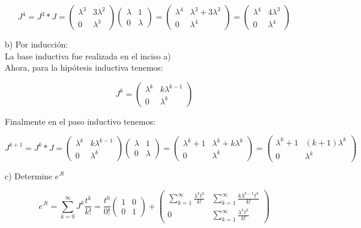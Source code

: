 $$J^4= J^3 * J= 
\begin{pmatrix}
\lambda^3 & 3\lambda^2\\
0 & \lambda^3
\end{pmatrix}
\begin{pmatrix}
\lambda & 1\\
0 & \lambda
\end{pmatrix}=
\begin{pmatrix}
\lambda^4 & \lambda^3 + 3\lambda^3\\
0 & \lambda^4
\end{pmatrix}=
\begin{pmatrix}
\lambda^4 & 4\lambda^3\\
0 & \lambda^4
\end{pmatrix}$$

b) Por inducción:\\

La base inductiva fue realizada en el inciso a)\\

Ahora, para la hipótesis inductiva tenemos:

$$J^k= \begin{pmatrix}
\lambda^k & k \lambda^{k-1}\\
0 & \lambda^k
\end{pmatrix}$$

Finalmente en el paso inductivo tenemos: 

$$J^{k+1}= J^{k}* J= \begin{pmatrix}
\lambda^k & k \lambda^{k-1}\\
0 & \lambda^k
\end{pmatrix}
\begin{pmatrix}
\lambda & 1\\
0 & \lambda
\end{pmatrix}=
\begin{pmatrix}
\lambda^k +1 & \lambda^k + k \lambda^k\\
0 & \lambda^k
\end{pmatrix}=
\begin{pmatrix}
\lambda^k +1 & (k+1)\lambda^k\\
0 & \lambda^k
\end{pmatrix}$$

c) Determine $e^{Jt}$

$$e^{Jt}= \displaystyle \sum_{k=0}^{\infty} J^k \frac{t^k}{k!}= \frac{t^0}{0!}
\begin{pmatrix}
1 & 0\\
0 & 1
\end{pmatrix}+
\begin{pmatrix}
\displaystyle \sum_{k=1}^{\infty} \frac{\lambda^k t^k}{k!} & \displaystyle \sum_{k=1}^{\infty} \frac{k \lambda^{k-1} t^k}{k!}\\
0 & \displaystyle \sum_{k=1}^{\infty} \frac{\lambda^k t^k}{k!}
\end{pmatrix}$$

